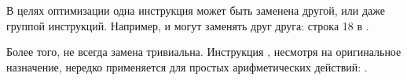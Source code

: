 В целях оптимизации одна инструкция может быть заменена другой, или даже группой инструкций.
Например, \ADD и \SUB могут заменять друг друга:
строка 18 в .

Более того, не всегда замена тривиальна. Инструкция \LEA, несмотря на оригинальное назначение, нередко применяется для простых арифметических действий: .




